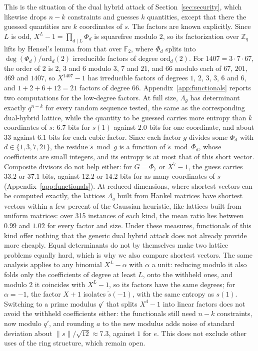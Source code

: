 \documentclass[11pt,a4paper]{article}
\theoremstyle{definition}
\newcommand{\Zq}{\mathbb{Z}_q}
\begin{document}
This is the situation of the dual hybrid attack of Section~\ref{sec:security}, which likewise drops $n - k$ constraints and guesses $k$ quantities, except that there the guessed quantities are $k$ coordinates of $s$. The factors are known explicitly. Since $L$ is odd, $X^L - 1 = \prod_{d \mid L} \Phi_d$ is squarefree modulo $2$, so its factorization over $\Zq$ lifts by Hensel's lemma from that over $\mathbb{F}_2$, where $\Phi_d$ splits into $\deg(\Phi_d)/\mathrm{ord}_d(2)$ irreducible factors of degree $\mathrm{ord}_d(2)$. For $1407 = 3 \cdot 7 \cdot 67$, the order of $2$ is $2$, $3$ and $6$ modulo $3$, $7$ and $21$, and $66$ modulo each of $67$, $201$, $469$ and $1407$, so $X^{1407} - 1$ has irreducible factors of degrees $1$, $2$, $3$, $3$, $6$ and $6$, and $1 + 2 + 6 + 12 = 21$ factors of degree $66$. Appendix~\ref{app:functionals} reports two computations for the low-degree factors. At full size, $\Lambda_g$ has determinant exactly $q^{n-k}$ for every random sequence tested, the same as the corresponding dual-hybrid lattice, while the quantity to be guessed carries more entropy than $k$ coordinates of $s$: $6.7$ bits for $s(1)$ against $2.0$ bits for one coordinate, and about $33$ against $6.1$ bits for each cubic factor. Since each factor $g$ divides some $\Phi_d$ with $d \in \{1, 3, 7, 21\}$, the residue $\tilde{s} \bmod g$ is a function of $\tilde{s} \bmod \Phi_d$, whose coefficients are small integers, and its entropy is at most that of this short vector. Composite divisors do not help either: for $G = \Phi_7$ or $X^7 - 1$, the guess carries $33.2$ or $37.1$ bits, against $12.2$ or $14.2$ bits for as many coordinates of $s$ (Appendix~\ref{app:functionals}). At reduced dimensions, where shortest vectors can be computed exactly, the lattices $\Lambda_g$ built from Hankel matrices have shortest vectors within a few percent of the Gaussian heuristic, like lattices built from uniform matrices: over 315 instances of each kind, the mean ratio lies between $0.99$ and $1.02$ for every factor and size. Under these measures, functionals of this kind offer nothing that the generic dual hybrid attack does not already provide more cheaply. Equal determinants do not by themselves make two lattice problems equally hard, which is why we also compare shortest vectors. The same analysis applies to any binomial $X^L - \alpha$ with $\alpha$ a unit: reducing modulo it also folds only the coefficients of degree at least $L$, onto the withheld ones, and modulo $2$ it coincides with $X^L - 1$, so its factors have the same degrees; for $\alpha = -1$, the factor $X + 1$ isolates $\tilde{s}(-1)$, with the same entropy as $s(1)$. Switching to a prime modulus $q'$ that splits $X^d - 1$ into linear factors does not avoid the withheld coefficients either: the functionals still need $n - k$ constraints, now modulo $q'$, and rounding $a$ to the new modulus adds noise of standard deviation about $\|s\|/\sqrt{12} \approx 7.3$, against $1$ for $e$. This does not exclude other uses of the ring structure, which remain open.
\end{document}
